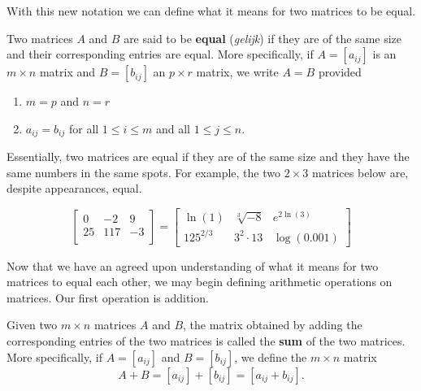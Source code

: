 With this new notation we can define what it means for two matrices to be equal.

\smallskip


	
\begin{definition} \label{matrixequality} 
Two matrices $A$ and $B$ are said to be  \textbf{equal} (\textit{gelijk}) if they are of the same size and their corresponding entries are equal.  More specifically, if $A=\left[a_{ij}\right]$ is an $m \times n$ matrix and $B =\left[b_{ij}\right]$ an $p \times r$ matrix, we write $A=B$ provided 
		
\begin{enumerate}	
\item  $m=p$ and $n=r$
\item  $a_{ij} = b_{ij}$ for all $1 \leq i \leq m$ and all $1 \leq j \leq n$.		
\end{enumerate}
\end{definition}
	

\smallskip

Essentially, two matrices are equal if they are of the same size and they have the same numbers in the same spots. For example, the two $2 \times 3$ matrices below are, despite appearances, equal.

\[ \left[ \begin{array}{rrr} 0 & -2 & 9 \\ 25 & 117 & -3 \\ \end{array} \right] =  \left[ \begin{array}{rrr} \ln(1) & \sqrt[3]{-8} & e^{2\ln(3)} \\ 125^{2/3} &  3^{2} \cdot 13 & \log(0.001)  \end{array} \right]\]

Now that we have an agreed upon understanding of what it means for two matrices to equal each other, we may begin defining arithmetic operations on matrices.  Our first operation is addition.
\smallskip


\begin{definition} \label{matrixaddition}  
Given two $m \times n$ matrices $A$ and $B$, the matrix obtained by adding the corresponding entries of the two matrices is called the  \textbf{sum} of the two matrices. More specifically,  if $A =\left[a_{ij}\right]$ and $B =\left[b_{ij}\right]$, we define the $m \times n$ matrix \[A + B = \left[a_{ij}\right]+ \left[b_{ij}\right] = \left[ a_{ij} + b_{ij} \right].\]		
\end{definition}
	
